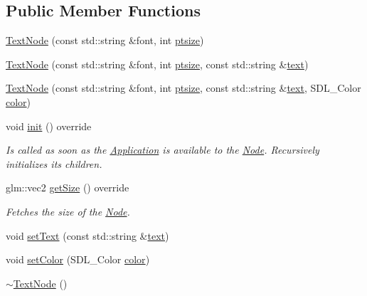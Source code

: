 \subsection*{Public Member Functions}
\begin{DoxyCompactItemize}
\item 
\mbox{\hyperlink{classsage_1_1TextNode_a5fbde25db3407b5e5e84ef297821dec6}{Text\+Node}} (const std\+::string \&font, int \mbox{\hyperlink{classsage_1_1TextNode_a1811c136026bea8ba6f27184e2d53c0c}{ptsize}})
\item 
\mbox{\hyperlink{classsage_1_1TextNode_a9988fa03958e378b3fd612ea3a103649}{Text\+Node}} (const std\+::string \&font, int \mbox{\hyperlink{classsage_1_1TextNode_a1811c136026bea8ba6f27184e2d53c0c}{ptsize}}, const std\+::string \&\mbox{\hyperlink{classsage_1_1TextNode_a2828e281a4ea3cce151de7cc983ca2c0}{text}})
\item 
\mbox{\hyperlink{classsage_1_1TextNode_a5677717ec6c2db9e311a40ad1510adb9}{Text\+Node}} (const std\+::string \&font, int \mbox{\hyperlink{classsage_1_1TextNode_a1811c136026bea8ba6f27184e2d53c0c}{ptsize}}, const std\+::string \&\mbox{\hyperlink{classsage_1_1TextNode_a2828e281a4ea3cce151de7cc983ca2c0}{text}}, S\+D\+L\+\_\+\+Color \mbox{\hyperlink{classsage_1_1TextNode_a08cbe2019a8aef4f1bd17a3f73a04d27}{color}})
\item 
void \mbox{\hyperlink{classsage_1_1TextNode_ae389b7b4afae4d068ac29686343f279e}{init}} () override
\begin{DoxyCompactList}\small\item\em Is called as soon as the \mbox{\hyperlink{classsage_1_1Application}{Application}} is available to the \mbox{\hyperlink{classsage_1_1Node}{Node}}. Recursively initializes its children. \end{DoxyCompactList}\item 
glm\+::vec2 \mbox{\hyperlink{classsage_1_1TextNode_ac5aa86ad68f3470c50f7021695a6c45d}{get\+Size}} () override
\begin{DoxyCompactList}\small\item\em Fetches the size of the \mbox{\hyperlink{classsage_1_1Node}{Node}}. \end{DoxyCompactList}\item 
void \mbox{\hyperlink{classsage_1_1TextNode_a81f9aa6c3c25d5b2b53904becad654fe}{set\+Text}} (const std\+::string \&\mbox{\hyperlink{classsage_1_1TextNode_a2828e281a4ea3cce151de7cc983ca2c0}{text}})
\item 
void \mbox{\hyperlink{classsage_1_1TextNode_a46a1738c681f158ab1d2468d3ec02a24}{set\+Color}} (S\+D\+L\+\_\+\+Color \mbox{\hyperlink{classsage_1_1TextNode_a08cbe2019a8aef4f1bd17a3f73a04d27}{color}})
\item 
\mbox{\hyperlink{classsage_1_1TextNode_a3ad8241316536959f2727a0abb8dc3e7}{$\sim$\+Text\+Node}} ()
\end{DoxyCompactItemize}
